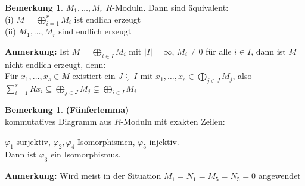 \documentclass[10pt,a4paper,numbers=endperiod]{scrreprt}
\theoremstyle{definition}
\newtheorem{bem}[satz]{Bemerkung}
\begin{document}
\begin{bem}
	$M_1, \ldots, M_r$ $R$-Moduln. Dann sind äquivalent:\\
	(i) $M = \bigoplus\limits_{i = 1}^r M_i$ ist endlich erzeugt\\
	(ii) $M_1, \ldots, M_r$ sind endlich erzeugt
\end{bem}

\textbf{Anmerkung:} Ist $M = \bigoplus\limits_{i \in I} M_i$ mit $|I| = \infty$, $M_i \neq 0$ für alle $i \in I$, dann ist $M$ nicht endlich erzeugt, denn:\\
Für $x_1, \ldots, x_s \in M$ existiert ein $J \subsetneq I$ mit $x_1, \ldots, x_s \in \bigoplus\limits_{j \in J} M_j$, also $\sum\limits_{i = 1}^s Rx_i \subseteq \bigoplus\limits_{j \in J} M_j \subsetneq \bigoplus\limits_{i \in I} M_i$
\newpage
\begin{bem}
	\textbf{(Fünferlemma)}\\
	kommutatives Diagramm aus $R$-Moduln mit exakten Zeilen:\\
	
	
	$\varphi_1$ surjektiv, $\varphi_2, \varphi_4$ Isomorphismen, $\varphi_5$ injektiv.\\
	Dann ist $\varphi_3$ ein Isomorphismus.
\end{bem}

\textbf{Anmerkung:} Wird meist in der Situation $M_1 = N_1 = M_5 = N_5 = 0$ angewendet
\end{document}
